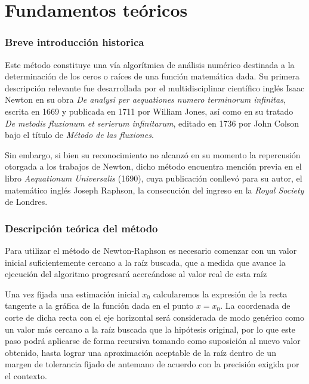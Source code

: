 \documentclass{beamer}
\begin{document}
\section{Fundamentos teóricos}

\begin{frame}

\frametitle{Breve introducción historica}


Este método constituye una vía algorítmica de análisis numérico destinada a la 
determinación de los ceros o raíces de una función matemática dada. Su primera 
descripción relevante fue desarrollada por el multidisciplinar científico inglés 
Isaac Newton en su obra \emph{De analysi per aequationes numero terminorum infinitas}, 
escrita en 1669 y publicada en 1711 por William Jones, así como en su tratado \emph{De 
metodis fluxionum et serierum infinitarum}, editado en 1736 por John Colson bajo el título 
de \emph{Método de las fluxiones}.

Sin embargo, si bien su reconocimiento no alcanzó en su momento la repercusión otorgada a
los trabajos de Newton, dicho método encuentra mención previa en el libro \emph {Aequationum 
Universalis} (1690), cuya publicación conllevó para su autor, el matemático inglés Joseph 
Raphson, la consecución del ingreso en la \emph{Royal Society} de Londres.  

\end{frame} 

\begin{frame}

\frametitle{Descripción teórica del método}


 
Para utilizar el método de Newton-Raphson es necesario comenzar con un valor inicial 
suficientemente cercano a la raíz buscada, que a medida que avance la ejecución del 
algoritmo progresará acercándose al valor real de esta raíz 

Una vez fijada una estimación inicial $x_{0}$ calcularemos la expresión de la recta 
tangente a la gráfica de la función dada en el punto $x = x_{0}$. La coordenada de 
corte de dicha recta con el eje horizontal será considerada de modo genérico como un
valor más cercano a la raíz buscada que la hipótesis original, por lo que este paso 
podrá aplicarse de forma recursiva tomando como suposición al nuevo valor obtenido, 
hasta lograr una aproximación aceptable de la raíz dentro de un margen de tolerancia 
fijado de antemano de acuerdo con la precisión exigida por el contexto.

\end{frame}
\end{document}
